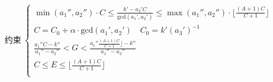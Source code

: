 \documentclass[preview]{standalone}
\begin{document}
\begin{align*}
\text{约束}~\begin{cases}\min (a_1'', a_2'') \cdot C \leq \frac{k' - a_3' C}{\mathrm{gcd}(a_1', a_2')} \leq \max (a_1'', a_2'') \cdot \lfloor \frac{(A + 1)C}{C + 1} \rfloor \\C = C_0 + \alpha \cdot \mathrm{gcd}(a_1', a_2') \quad C_0 = k' (a_3')^{-1} \\\frac{a_1'' C - k''}{a_1'' - a_2''} < G < \frac{a_1'' \frac{(A + 1)C}{C + 1} \rfloor - k''}{a_1'' - a_2''} \\C \leq E \leq \lfloor \frac{(A + 1)C}{C + 1} \rfloor \\\end{cases}
\end{align*}
\end{document}
